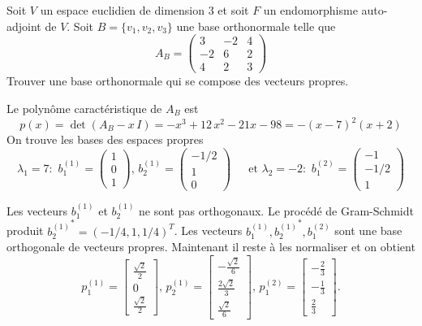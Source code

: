 \begin{example}
  \label{exe:17}
  Soit $V$ un espace euclidien de dimension $3$ et soit $F$ un endomorphisme auto-adjoint de $V$. Soit $B=\{v_1,v_2,v_3\}$ une base orthonormale telle que 
  \begin{displaymath}
    A_B =
    \begin{pmatrix}
      3 & -2 & 4\\-2 & 6 & 2\\4 & 2 & 3
    \end{pmatrix}
  \end{displaymath}
Trouver une base orthonormale qui se compose des vecteurs propres. 


\bigskip 

Le polynôme caractéristique de $A_B$ est 
\begin{displaymath}
  p(x) = \det(A_B - x\, I) =  -x^3 + 12\, x^2 -21 x - 98 = -(x-7)^2(x+2)
\end{displaymath}
On trouve les bases des espaces propres
\begin{displaymath}
  \lambda_1 = 7: \, \,
b_1^{(1)} = \begin{pmatrix}
    1 \\ 0 \\ 1 
  \end{pmatrix}, \, 
b_2^{(1)} =   \begin{pmatrix}
    -1/2\\1\\0
  \end{pmatrix} \, \quad \text{ et } 
  \lambda_2 = -2: \, \, 
  b_1^{(2)} = 
  \begin{pmatrix}
    -1 \\ -1/2 \\1
  \end{pmatrix}  
\end{displaymath}

Les vecteurs $b_1^{(1)}$
et $b_2^{(1)}$
ne sont pas orthogonaux.  Le procédé de Gram-Schmidt produit
${b_2^{(1)}}^* = (-1/4,1,1/4)^T$.
Les vecteurs $b_1^{(1)},{b_2^{(1)}}^*,b_1^{(2)}$
sont une base orthogonale de vecteurs propres. Maintenant il reste à
les normaliser et on obtient
\begin{displaymath}
p_1^{(1)} = 
\left[\begin{matrix}\frac{\sqrt{2}}{2}\\0\\\frac{\sqrt{2}}{2}\end{matrix}\right], \, 
{p_2^{(1)}} = \left[\begin{matrix}- \frac{\sqrt{2}}{6}\\\frac{2 \sqrt{2}}{3}\\\frac{\sqrt{2}}{6}\end{matrix}\right], \, 
p_1^{(2)} = \left[\begin{matrix}-\frac{2}{3}\\-\frac{1}{3}\\\frac{2}{3}\end{matrix}\right]. 
\end{displaymath}


\end{example}
